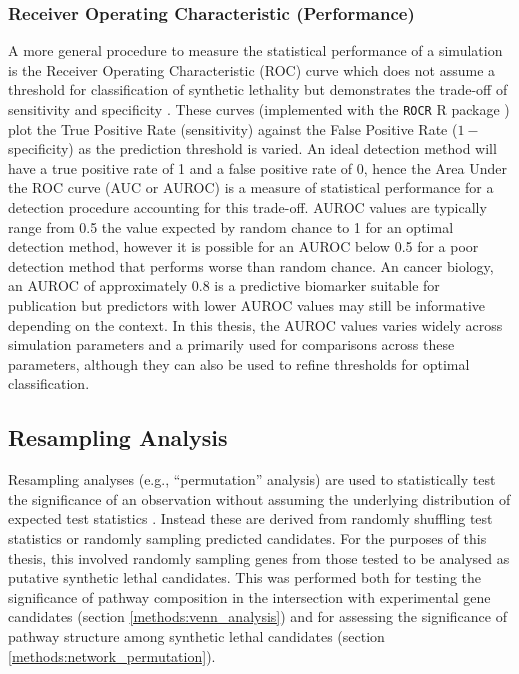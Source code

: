 \subsubsection{Receiver Operating Characteristic (Performance)}
A more general procedure to measure the statistical performance of a simulation is the Receiver Operating Characteristic (ROC) curve which does not assume a threshold for classification of synthetic lethality but demonstrates the trade-off of sensitivity and specificity \citep{Zweig1993, Fawcett2006, Akobeng2007}. These curves (implemented with the \texttt{ROCR} R package \citep{ROCR}) plot the True Positive Rate (sensitivity) against the False Positive Rate ($1-$specificity) as the prediction threshold is varied. An ideal detection method will have a true positive rate of 1 and a false positive rate of 0, hence the Area Under the ROC curve (AUC or AUROC) is a measure of statistical performance for a detection procedure accounting for this trade-off. AUROC values are typically range from 0.5 the value expected by random chance to 1 for an optimal detection method, however it is possible for an AUROC below 0.5 for a poor detection method that performs worse than random chance. An cancer biology, an AUROC of approximately $0.8$ is a predictive biomarker suitable for publication \citep{Hajian-Tilaki2013} but predictors with lower AUROC values may still be informative depending on the context. In this thesis, the AUROC values varies widely across simulation parameters and a primarily used for comparisons across these parameters, although they can also be used to refine thresholds for optimal classification. 

\subsection{Resampling Analysis} \label{methods:permutation}
Resampling analyses (e.g., ``permutation'' analysis) are used to statistically test the significance of an observation without assuming the underlying distribution of expected test statistics \citet{Collingridge2013}. Instead these are derived from randomly shuffling test statistics or randomly sampling predicted candidates. For the purposes of this thesis, this involved randomly sampling genes from those tested to be analysed as putative synthetic lethal candidates. This was performed both for testing the significance of pathway composition in the intersection with experimental gene candidates (section \ref{methods:venn_analysis}) and for assessing the significance of pathway structure among synthetic lethal candidates (section \ref{methods:network_permutation}).

